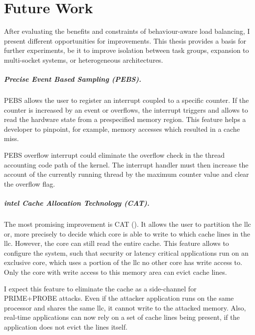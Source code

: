 \chapter{Future Work}
\label{sec:futurework}


After evaluating the benefits and constraints of behaviour-aware load
balancing, I present different opportunities for improvements.
This thesis provides a basis for further experiments, be it to improve
isolation between task groups, expansion to multi-socket systems, or
heterogeneous architectures.

\paragraph{Precise Event Based Sampling (PEBS).}
PEBS allows the user to register an interrupt coupled to a specific counter.
If the counter is increased by an event or overflows, the interrupt triggers
and allows to read the hardware state from a prespecified memory region.
This feature helps a developer to pinpoint, for example, memory accesses which
resulted in a cache miss.

PEBS overflow interrupt could eliminate the overflow check in the thread
accounting code path of the kernel.
The interrupt handler must then increase the account of the currently running
thread by the maximum counter value and clear the overflow flag.

\paragraph{\gls{intel} Cache Allocation Technology (CAT).}
The most promising improvement is CAT (\cite{intel_cat}).
It allows the user to partition the \gls{llc} or, more precisely to decide
which core is able to write to which cache lines in the \gls{llc}.
However, the core can still read the entire cache.
This feature allows to configure the system, such that security or latency
critical applications run on an exclusive core, which uses a portion of the
\gls{llc} no other core has write access to.
Only the core with write access to this memory area can evict cache lines.

I expect this feature to eliminate the cache as a side-channel for PRIME+PROBE
attacks.
Even if the attacker application runs on the same processor and shares the same
\gls{llc}, it cannot write to the attacked memory.
Also, real-time applications can now rely on a set of cache lines being
present, if the application does not evict the lines itself.

